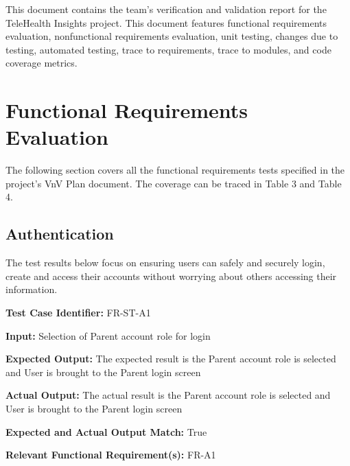 \documentclass[12pt, titlepage]{article}
\begin{document}
\newpage

\tableofcontents

\listoftables %

\listoffigures %

\newpage


\hspace{2em}This document contains the team's verification and validation report for the TeleHealth
Insights project. This document features functional requirements evaluation, nonfunctional requirements
evaluation, unit testing, changes due to testing, automated testing, trace to requirements, trace to modules,
and code coverage metrics.

\section{Functional Requirements Evaluation}
\hspace{2em}The following section covers all the functional requirements tests specified in the project's
VnV Plan document. The coverage can be traced in Table 3 and Table 4.

\subsection{Authentication}
\hspace{2em}The test results below focus on ensuring users can safely and securely login, create and
access their accounts without worrying about others accessing their information.

\begin{mdframed}[linewidth=0.5mm] \par
  \textbf{Test Case Identifier:} FR-ST-A1 \par
  \textbf{Input:} Selection of Parent account role for login \par
  \textbf{Expected Output:} The expected result is the Parent account role is selected and User is brought to the Parent login screen \par
  \textbf{Actual Output:} The actual result is the Parent account role is selected and User is brought to the Parent login screen \par
  \textbf{Expected and Actual Output Match:} True \par
  \textbf{Relevant Functional Requirement(s):} FR-A1
\end{mdframed}
\end{document}
